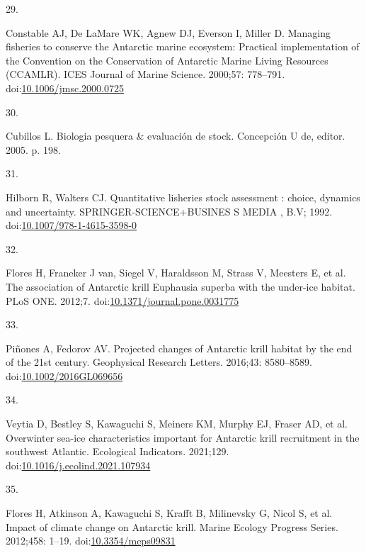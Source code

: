 \documentclass[
]{article}
\newlength{\cslhangindent}
\newlength{\csllabelwidth}
\newlength{\cslentryspacingunit} %
\newenvironment{CSLReferences}[2] %
 {%
  \setlength{\parindent}{0pt}
  \ifodd #1
  \let\oldpar\par
  \def\par{\hangindent=\cslhangindent\oldpar}
  \fi
  \setlength{\parskip}{#2\cslentryspacingunit}
 }%
 {}
\newcommand{\CSLLeftMargin}[1]{\parbox[t]{\csllabelwidth}{#1}}
\newcommand{\CSLRightInline}[1]{\parbox[t]{\linewidth - \csllabelwidth}{#1}\break}
\begin{document}
\begin{CSLReferences}{0}{0}
\leavevmode{}%
\CSLLeftMargin{29. }%
\CSLRightInline{Constable AJ, De LaMare WK, Agnew DJ, Everson I, Miller
D. {Managing fisheries to conserve the Antarctic marine ecosystem:
Practical implementation of the Convention on the Conservation of
Antarctic Marine Living Resources (CCAMLR)}. ICES Journal of Marine
Science. 2000;57: 778--791.
doi:\href{https://doi.org/10.1006/jmsc.2000.0725}{10.1006/jmsc.2000.0725}}

\leavevmode{}%
\CSLLeftMargin{30. }%
\CSLRightInline{Cubillos L. {Biologia pesquera {\&} evaluaci{ó}n de
stock}. Concepción U de, editor. 2005. p. 198. }

\leavevmode{}%
\CSLLeftMargin{31. }%
\CSLRightInline{Hilborn R, Walters CJ. {Quantitative lisheries stock
assessment : choice, dynamics and uncertainty.} SPRINGER-SCIENCE+BUSINES
S MEDIA , B.V; 1992.
doi:\href{https://doi.org/10.1007/978-1-4615-3598-0}{10.1007/978-1-4615-3598-0}}

\leavevmode{}%
\CSLLeftMargin{32. }%
\CSLRightInline{Flores H, Franeker J van, Siegel V, Haraldsson M, Strass
V, Meesters E, et al. {The association of Antarctic krill Euphausia
superba with the under-ice habitat}. PLoS ONE. 2012;7.
doi:\href{https://doi.org/10.1371/journal.pone.0031775}{10.1371/journal.pone.0031775}}

\leavevmode{}%
\CSLLeftMargin{33. }%
\CSLRightInline{Piñones A, Fedorov AV. {Projected changes of Antarctic
krill habitat by the end of the 21st century}. Geophysical Research
Letters. 2016;43: 8580--8589.
doi:\href{https://doi.org/10.1002/2016GL069656}{10.1002/2016GL069656}}

\leavevmode{}%
\CSLLeftMargin{34. }%
\CSLRightInline{Veytia D, Bestley S, Kawaguchi S, Meiners KM, Murphy EJ,
Fraser AD, et al. {Overwinter sea-ice characteristics important for
Antarctic krill recruitment in the southwest Atlantic}. Ecological
Indicators. 2021;129.
doi:\href{https://doi.org/10.1016/j.ecolind.2021.107934}{10.1016/j.ecolind.2021.107934}}

\leavevmode{}%
\CSLLeftMargin{35. }%
\CSLRightInline{Flores H, Atkinson A, Kawaguchi S, Krafft B, Milinevsky
G, Nicol S, et al. {Impact of climate change on Antarctic krill}. Marine
Ecology Progress Series. 2012;458: 1--19.
doi:\href{https://doi.org/10.3354/meps09831}{10.3354/meps09831}}


\end{CSLReferences}
\end{document}
